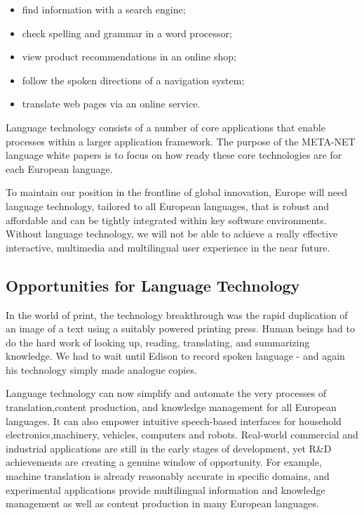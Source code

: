 \documentclass[]{../../metanetpaper}
\begin{document}
\begin{multicols}{2}
\begin{itemize}
\item find information with a search engine;
\item check spelling and grammar in a word processor;
\item view product recommendations in an online shop;
\item follow the spoken directions of a navigation system;
\item translate web pages via an online service.
\end{itemize}

Language technology consists of a number of core applications that enable processes within a larger application framework. The purpose of the META-NET language white papers is to focus on how ready these core technologies are for each European language. 


To maintain our position in the frontline of global innovation, Europe will need language technology, tailored to all European languages, that is robust and affordable and can be tightly integrated within key software environments. Without language technology, we will not be able to achieve a really effective interactive, multimedia and multilingual user experience in the near future.



\subsection{Opportunities for Language Technology}

In the world of print, the technology breakthrough was the rapid duplication
of an image of a text using a suitably powered printing press. Human beings
had to do the hard work of looking up, reading, translating, and summarizing
knowledge. We had to wait until Edison to record spoken language - and again
his technology simply made analogue copies.


Language technology can now simplify and automate the very processes of 
translation,content production, and knowledge management for all European 
languages. It can also empower intuitive speech-based interfaces for household 
electronics,machinery, vehicles, computers and robots. Real-world commercial 
and industrial applications are still in the early stages of development, yet 
R\&D achievements are creating a genuine window of opportunity. For example,
machine translation is already reasonably accurate in specific domains, and
experimental applications provide multilingual information and knowledge
management as well as content production in many European languages. 



\end{multicols}
\end{document}
